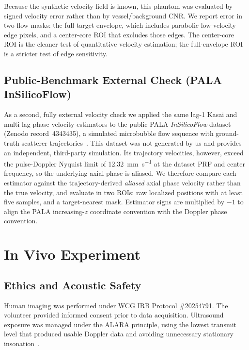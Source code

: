 \documentclass[11pt]{article}
\begin{document}
Because the synthetic velocity field is known, this phantom was
evaluated by signed velocity error rather than by vessel/background
CNR.  We report error in two flow masks: the full target envelope,
which includes parabolic low-velocity edge pixels, and a center-core
ROI that excludes those edges.  The center-core ROI is the cleaner
test of quantitative velocity estimation; the full-envelope ROI is a
stricter test of edge sensitivity.

\subsection{Public-Benchmark External Check (PALA InSilicoFlow)}
\label{sec:zenodo_check}

As a second, fully external velocity check we applied the same lag-1
Kasai and multi-lag phase-velocity estimators to the public PALA
\emph{InSilicoFlow} dataset (Zenodo record~4343435), a simulated
microbubble flow sequence with ground-truth scatterer
trajectories~\cite{heiles2022pala}.  This dataset was not generated by
us and provides an independent, third-party simulation.  Its trajectory
velocities, however, exceed the pulse-Doppler Nyquist limit of
\SI{12.32}{\milli\meter\per\second} at the dataset PRF and center
frequency, so the underlying axial phase is aliased.  We therefore
compare each estimator against the trajectory-derived \emph{aliased}
axial phase velocity rather than the true velocity, and evaluate in two
ROIs: raw localized positions with at least five samples, and a
target-nearest mask.  Estimator signs are multiplied by $-1$ to align
the PALA increasing-$z$ coordinate convention with the Doppler phase
convention.

\section{In Vivo Experiment}
\label{sec:invivo}

\subsection{Ethics and Acoustic Safety}

Human imaging was performed under WCG IRB Protocol \#20254791.  The
volunteer provided informed consent prior to data acquisition.
Ultrasound exposure was managed under the ALARA principle, using the
lowest transmit level that produced usable Doppler data and avoiding
unnecessary stationary insonation~\cite{aium2020alara,fda2023diagnosticultrasound}.
\end{document}
